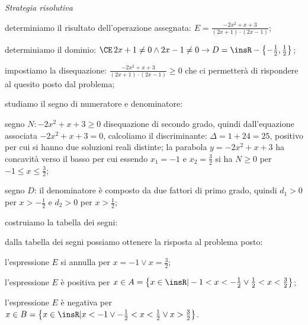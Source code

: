 \begin{exrig}
\begin{esempio}
\emph{Strategia risolutiva}
\begin{enumeratea}
\item determiniamo il risultato dell’operazione assegnata: $E=\frac{-2x^2+x+3}{(2x+1)\cdot (2x-1)}$;
\item determiniamo il dominio: $\CE\, 2x+1\neq 0\wedge 2x-1\neq 0\to D=\insR-\left\{-\frac 1 2,\frac 1 2\right\}$;
\item impostiamo la disequazione: $\frac{-2x^2+x+3}{(2x+1)\cdot (2x-1)}\ge 0$ che ci permetterà di rispondere al quesito posto dal problema;
\item studiamo il segno di numeratore e denominatore:
 \begin{itemize*}
\item segno $N: -2x^2+x+3\ge 0$ disequazione di secondo grado, quindi dall’equazione associata $-2x^2+x+3=0$, calcoliamo il discriminante: $\Delta =1+24=25$, positivo per cui si hanno due soluzioni reali distinte; la parabola $y=-2x^2+x+3$ ha concavità verso il basso per cui essendo $x_1=-1$ e $x_2=\frac 3 2$ si ha $N\ge 0$ per $-1\le x\le \frac 3 2$;
\item segno $D$: il denominatore è composto da due fattori di primo grado, quindi $d_1>0$ per $x>-\frac 1 2$ e $d_2>0$ per $x>\frac 1 2$;
 \end{itemize*}
\item costruiamo la tabella dei segni:
\begin{center}
 
\end{center}
\item dalla tabella dei segni possiamo ottenere la risposta al problema posto:
\begin{itemize*}
\item l’espressione $E$ si annulla per $x=-1\vee x=\frac 3 2$;
\item l’espressione $E$ è positiva per $x\in A=\left\{x\in \insR | -1<x<-\frac 1 2\vee \frac 1 2<x<\frac 3 2\right\}$;
\item l’espressione $E$ è negativa per $x\in B=\left\{x\in \insR | x<-1\vee -\frac 1 2<x<\frac 1 2\vee x>\frac 3 2\right\}$.
\end{itemize*}
\end{enumeratea}
\end{esempio}


\end{exrig}
